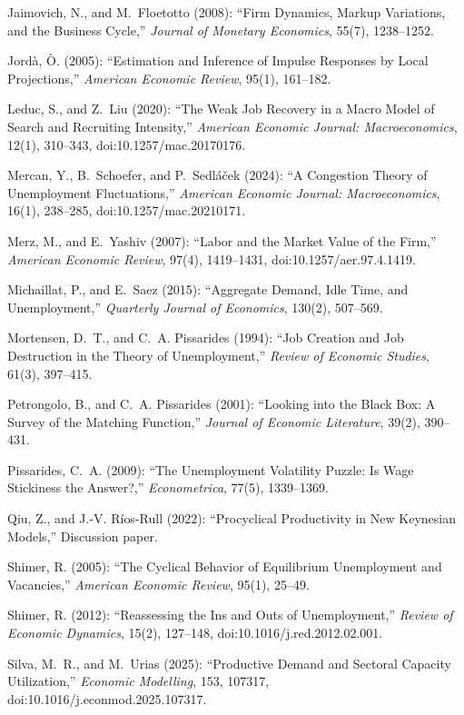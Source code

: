 \documentclass[authoryear, review, 12pt]{elsarticle}
\begin{document}
\begin{thebibliography}{}
Jaimovich, N., and M.~Floetotto (2008): ``Firm Dynamics, Markup Variations, and the Business Cycle,'' \emph{Journal of Monetary Economics}, 55(7), 1238--1252.

Jord{\`a}, {\`O}. (2005): ``Estimation and Inference of Impulse Responses by Local Projections,'' \emph{American Economic Review}, 95(1), 161--182.

Leduc, S., and Z.~Liu (2020): ``The Weak Job Recovery in a Macro Model of Search and Recruiting Intensity,'' \emph{American Economic Journal: Macroeconomics}, 12(1), 310--343, doi:10.1257/mac.20170176.

Mercan, Y., B.~Schoefer, and P.~Sedl{\'a}{\v c}ek (2024): ``A Congestion Theory of Unemployment Fluctuations,'' \emph{American Economic Journal: Macroeconomics}, 16(1), 238--285, doi:10.1257/mac.20210171.

Merz, M., and E.~Yashiv (2007): ``Labor and the Market Value of the Firm,'' \emph{American Economic Review}, 97(4), 1419--1431, doi:10.1257/aer.97.4.1419.

Michaillat, P., and E.~Saez (2015): ``Aggregate Demand, Idle Time, and Unemployment,'' \emph{Quarterly Journal of Economics}, 130(2), 507--569.

Mortensen, D.~T., and C.~A. Pissarides (1994): ``Job Creation and Job Destruction in the Theory of Unemployment,'' \emph{Review of Economic Studies}, 61(3), 397--415.

Petrongolo, B., and C.~A. Pissarides (2001): ``Looking into the Black Box: A Survey of the Matching Function,'' \emph{Journal of Economic Literature}, 39(2), 390--431.

Pissarides, C.~A. (2009): ``The Unemployment Volatility Puzzle: Is Wage Stickiness the Answer?,'' \emph{Econometrica}, 77(5), 1339--1369.

Qiu, Z., and J.-V. R{\'i}os-Rull (2022): ``Procyclical Productivity in New Keynesian Models,'' Discussion paper.

Shimer, R. (2005): ``The Cyclical Behavior of Equilibrium Unemployment and Vacancies,'' \emph{American Economic Review}, 95(1), 25--49.

Shimer, R. (2012): ``Reassessing the Ins and Outs of Unemployment,'' \emph{Review of Economic Dynamics}, 15(2), 127--148, doi:10.1016/j.red.2012.02.001.

Silva, M.~R., and M.~Urias (2025): ``Productive Demand and Sectoral Capacity Utilization,'' \emph{Economic Modelling}, 153, 107317, doi:10.1016/j.econmod.2025.107317.
\end{thebibliography}
\end{document}
